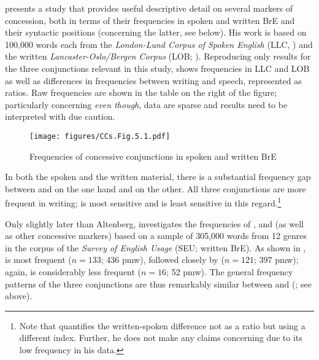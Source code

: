 \citet{Altenberg1986} presents a study that provides useful descriptive detail on several markers of concession, both in terms of their frequencies in spoken and written BrE and their syntactic positions (concerning the latter, see  below). His work is based on 100,000 words each from the \textit{London-Lund Corpus of Spoken English} (LLC, \citealt{SvartvikQuirk1980,GreenbaumSvartvik1990}) and the written \textit{Lancaster-Oslo/Bergen Corpus} (LOB; \citealt{JohanssonEtAl1978}). Reproducing only results for the three conjunctions relevant in this study,  shows frequencies in LLC and LOB as well as differences in frequencies between writing and speech, represented as ratios. Raw frequencies are shown in the table on the right of the figure; particularly concerning \textit{even though}, data are sparse and results need to be interpreted with due caution.

\begin{figure}
\texttt{[image: figures/CCs.Fig.5.1.pdf]}
\caption{\label{bkm:Ref471492512}\label{fig:5.1}Frequencies of concessive conjunctions in spoken and written BrE \citep{Altenberg1986} }
\end{figure}

In both the spoken and the written material, there is a substantial frequency gap between  and  on the one hand and  on the other. All three conjunctions are more frequent in writing;  is most sensitive and  is least sensitive in this regard.\footnote{Note that \citet{Altenberg1986} quantifies the written-spoken difference not as a ratio but using a different index. Further, he does not make any claims concerning  due to its low frequency in his data.}

Only slightly later than Altenberg, \citet{Aarts1988} investigates the frequencies of ,  and  (as well as other concessive markers) based on a sample of 305,000 words from 12 genres in the corpus of the \textit{Survey of English Usage} (SEU; written BrE). As shown in ,  is most frequent ($n=133$; 436 pmw), followed closely by  ($n=121$; 397 pmw); again,  is considerably less frequent ($n=16$; 52 pmw). The general frequency patterns of the three conjunctions are thus remarkably similar between \citet{Aarts1988} and \citeauthor{Altenberg1986} (\citeyear{Altenberg1986}; see above).

